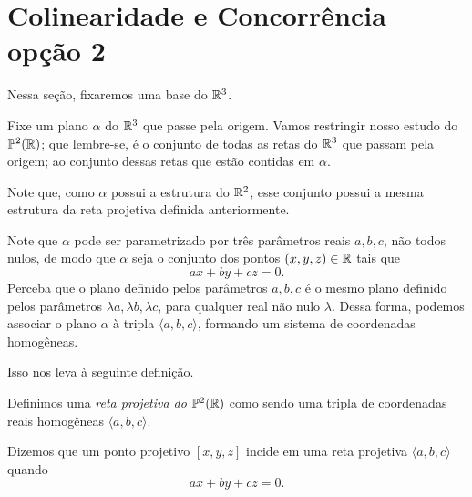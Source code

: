 \begin{comment}
Ou seja, a volta do problema é exatamente a ida "trocando" ponto por reta, e algo curioso do plano projetivo é que uma igualdade do tipo $ax+by+cz=0$ pode ser interpretada como, o ponto $[x,y,z]$ pertence a reta $<a,b,c>$ ou como o ponto $[a,b,c]$ pertence a reta $\langle x,y,z\rangle$, com isso para resolver a volta a gente vai fazer o seguinte truque:

Escolha uma base qualquer para $\RR^3$, imagine para cada reta que você calcular as coordenadas nos pontos com os mesmos números como coordenadas, no mundo dos pontos nos já sabemos que a conta fecha, e como a conta é exatamente a mesma para um mundo com retas e um mundo com pontos, temos que no munda das retas a conta também fecha, ou seja a volta é uma consequência direta da ida.
\end{proof}
\end{comment}

\section{Colinearidade e Concorrência opção 2}

Nessa seção, fixaremos uma base do \(\mathbb{R}^3\).

Fixe um plano $\alpha$ do \(\mathbb{R}^3\) que passe pela origem. 
Vamos restringir nosso estudo do \(\mathbb{P}^2(\mathbb{R})\); que lembre-se, é o conjunto de todas as retas do \(\mathbb{R}^3\) que passam pela origem; ao conjunto dessas retas que estão contidas em $\alpha$. 


Note que, como $\alpha$ possui a estrutura do $\mathbb{R}^2$, esse conjunto possui a mesma estrutura da reta projetiva definida anteriormente.

Note que $\alpha$ pode ser parametrizado por três parâmetros reais $a, b, c$, não todos nulos, de modo que $\alpha$ seja o conjunto dos pontos $(x, y, z) \in \mathbb{R}$ tais que \[
    ax + by + cz = 0.
\]
Perceba que o plano definido pelos parâmetros $a, b, c$ é o mesmo plano definido pelos parâmetros $\lambda a, \lambda b, \lambda c$, para qualquer real não nulo $\lambda$. Dessa forma, podemos associar o plano $\alpha$ à tripla $\langle a, b, c \rangle$, formando um sistema de coordenadas homogêneas.

Isso nos leva à seguinte definição.

\begin{defn}
Definimos uma \emph{reta projetiva do \(\mathbb{P}^2(\mathbb{R})\)} como sendo uma tripla de coordenadas reais homogêneas $\langle a, b, c \rangle$.

Dizemos que um ponto projetivo $[x, y, z]$ incide em uma reta projetiva $\langle a, b, c\rangle$ quando \[
ax + by + cz = 0.
\]
\end{defn}

